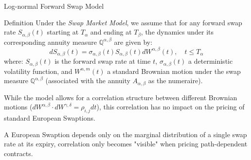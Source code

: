 \documentclass{beamer}
\begin{document}
\begin{frame}{Log-normal Forward Swap Model}
	\begin{block}{Definition}
		Under the \emph{Swap Market Model}, we assume that for any forward swap rate $S_{\alpha,\beta}(t)$ starting at $T_\alpha$ and ending at $T_\beta$, the dynamics under its corresponding annuity measure $\mathbb{Q}^{\alpha,\beta}$ are given by:
		\begin{equation}
			dS_{\alpha,\beta}(t) = \sigma_{\alpha,\beta}(t) S_{\alpha,\beta}(t) dW^{\alpha,\beta}(t), \quad t \leq T_\alpha
			\label{eq:swap_rate_dynamics}
		\end{equation}
		where: $S_{\alpha,\beta}(t)$ is the forward swap rate at time $t$, $\sigma_{\alpha,\beta}(t)$ a deterministic volatility function, and $W^{n,m}(t)$ a standard Brownian motion under the swap measure $\mathbb{Q}^{\alpha,\beta}$ (associated with the annuity $A_{\alpha,\beta}$ as the numeraire).
	\end{block}
	\vfill
	While the model allows for a correlation structure between different Brownian motions ($dW^{\alpha,\beta} \cdot dW^{\gamma,\delta} = \rho_{i,j} dt$), this correlation has no impact on the pricing of standard European Swaptions.
	
	A European Swaption depends only on the marginal distribution of a single swap rate at its expiry, correlation only becomes "visible" when pricing path-dependent contracts.
\end{frame}
\end{document}
